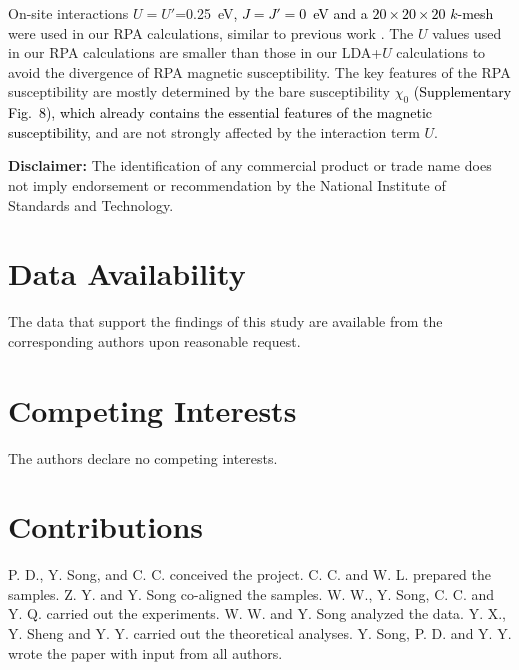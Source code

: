 \documentclass[aps,prl,onecolumn,amsmath,amssymb,superscriptaddress]{revtex4}
\newcommand{\yy}{\textcolor{black}}
\begin{document}

On-site interactions $U=U'$=0.25~eV\yy{, $J=J'=0$~eV and a $20\times20\times20$ $k$-mesh} were used in our RPA calculations, similar to previous work \cite{HIkeda2015}.  The $U$ values used in our RPA calculations are smaller than those in our LDA+$U$ calculations to avoid the divergence of RPA magnetic susceptibility. The key features of the RPA susceptibility are mostly determined by the bare susceptibility $\chi_0$ \yy{(Supplementary Fig.~8), which already contains the essential features of the magnetic susceptibility,} and are not strongly affected by the interaction term $U$.


{\bf Disclaimer:} The identification of any commercial product or trade name does not imply endorsement or recommendation by the National Institute of Standards and Technology.


\section{Data Availability}
The data that support the findings of this study are available from the corresponding authors upon reasonable request.

\section{Competing Interests}
The authors declare no competing interests.

\section{Contributions}
P. D., Y. Song, and C. C. conceived the project. C. C. and W. L. prepared the samples. Z. Y. and Y. Song co-aligned the samples. W. W., Y. Song, C. C. and Y. Q. carried out the experiments. W. W. and Y. Song analyzed the data. Y. X., Y. Sheng and Y. Y. carried out the theoretical analyses. Y. Song, P. D. and Y. Y. wrote the paper with input from all authors.    
\end{document}
